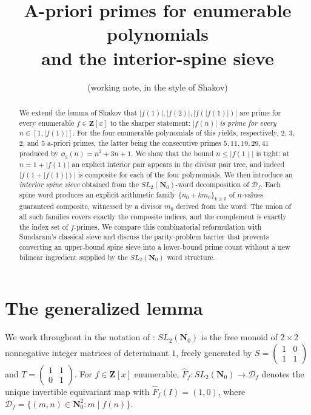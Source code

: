 \documentclass[11pt]{article}
\title{A-priori primes for enumerable polynomials \\ and the interior-spine sieve}
\author{(working note, in the style of Shakov)}
\date{}
\theoremstyle{definition}
\newcommand{\Nz}{\mathbf{N}_0}
\newcommand{\Z}{\mathbf{Z}}
\newcommand{\SLNz}{SL_2(\Nz)}
\newcommand{\Df}{\mathcal{D}_f}
\newcommand{\Ff}{\hat{F}_f}
\begin{document}
\maketitle

\begin{abstract}
We extend the lemma of Shakov \cite{shakov} that $|f(1)|,|f(2)|,|f(|f(1)|)|$ are prime for every enumerable $f \in \Z[x]$ to the sharper statement: \emph{$|f(n)|$ is prime for every $n \in [1,|f(1)|]$}. For the four enumerable polynomials of \cite[Theorem 2.5]{shakov} this yields, respectively, $2$, $3$, $2$, and $5$ a-priori primes, the latter being the consecutive primes $5,11,19,29,41$ produced by $\phi_3(n) = n^2+3n+1$. We show that the bound $n \le |f(1)|$ is tight: at $n = 1+|f(1)|$ an explicit interior pair appears in the divisor pair tree, and indeed $|f(1+|f(1)|)|$ is composite for each of the four polynomials. We then introduce an \emph{interior spine sieve} obtained from the $\SLNz$-word decomposition of $\Df$. Each spine word produces an explicit arithmetic family $\{n_0+km_0\}_{k\ge 0}$ of $n$-values guaranteed composite, witnessed by a divisor $m_0$ derived from the word. The union of all such families covers exactly the composite indices, and the complement is exactly the index set of $f$-primes. We compare this combinatorial reformulation with Sundaram's classical sieve and discuss the parity-problem barrier that prevents converting an upper-bound spine sieve into a lower-bound prime count without a new bilinear ingredient supplied by the $\SLNz$ word structure.
\end{abstract}

\tableofcontents

\section{The generalized lemma}\label{sec:gen-lemma}

We work throughout in the notation of \cite{shakov}: $\SLNz$ is the free monoid of $2\times 2$ nonnegative integer matrices of determinant $1$, freely generated by $S = \begin{pmatrix}1 & 0 \\ 1 & 1\end{pmatrix}$ and $T = \begin{pmatrix}1 & 1 \\ 0 & 1\end{pmatrix}$. For $f \in \Z[x]$ enumerable, $\Ff: \SLNz \to \Df$ denotes the unique invertible equivariant map with $\Ff(I) = (1,0)$, where $\Df = \{(m,n) \in \Nz^2 : m \mid f(n)\}$.
\end{document}
